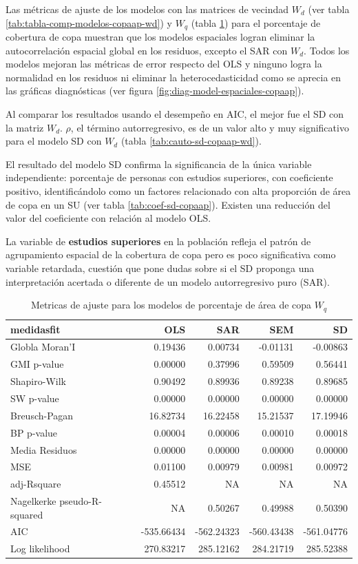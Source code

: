 \documentclass[12pt,a4paper,openany]{book}
\theoremstyle{definition}
\theoremstyle{definition}
\theoremstyle{definition}
\theoremstyle{remark}
\begin{document}
Las métricas de ajuste de los modelos con las matrices de vecindad
\(W_d\) (ver tabla \ref{tab:tabla-comp-modelos-copaap-wd}) y \(W_q\)
(tabla \ref{tab:tabla-comp-modelos-copaap-wq}) para el porcentaje de
cobertura de copa muestran que los modelos espaciales logran eliminar la
autocorrelación espacial global en los residuos, excepto el SAR con
\(W_d\). Todos los modelos mejoran las métricas de error respecto del
OLS y ninguno logra la normalidad en los residuos ni eliminar la
heterocedasticidad como se aprecia en las gráficas diagnósticas (ver
figura \ref{fig:diag-model-espaciales-copaap}).

Al comparar los resultados usando el desempeño en AIC, el mejor fue el
SD con la matriz \(W_d\). \(\rho\), el término autorregresivo, es de un
valor alto y muy significativo para el modelo SD con \(W_d\) (tabla
\ref{tab:cauto-sd-copaap-wd}).

El resultado del modelo SD confirma la significancia de la única
variable independiente: porcentaje de personas con estudios superiores,
con coeficiente positivo, identificándolo como un factores relacionado
con alta proporción de área de copa en un SU (ver tabla
\ref{tab:coef-sd-copaap}). Existen una reducción del valor del
coeficiente con relación al modelo OLS.

La variable de \textbf{estudios superiores} en la población refleja el
patrón de agrupamiento espacial de la cobertura de copa pero es poco
significativa como variable retardada, cuestión que pone dudas sobre si
el SD proponga una interpretación acertada o diferente de un modelo
autorregresivo puro (SAR).

\begin{table}[t]

\caption{\label{tab:tabla-comp-modelos-copaap-wq}Metricas de ajuste para los modelos de porcentaje de área de copa $W_q$}
\centering
\begin{tabular}{lrrrr}
\toprule
medidasfit & OLS & SAR & SEM & SD\\
\midrule
Globla Moran'I & 0.19436 & 0.00734 & -0.01131 & -0.00863\\
GMI p-value & 0.00000 & 0.37996 & 0.59509 & 0.56441\\
Shapiro-Wilk & 0.90492 & 0.89936 & 0.89238 & 0.89685\\
SW p-value & 0.00000 & 0.00000 & 0.00000 & 0.00000\\
Breusch-Pagan & 16.82734 & 16.22458 & 15.21537 & 17.19946\\
\addlinespace
BP p-value & 0.00004 & 0.00006 & 0.00010 & 0.00018\\
Media Residuos & 0.00000 & 0.00000 & 0.00000 & 0.00000\\
MSE & 0.01100 & 0.00979 & 0.00981 & 0.00972\\
adj-Rsquare & 0.45512 & NA & NA & NA\\
Nagelkerke pseudo-R-squared & NA & 0.50267 & 0.49988 & 0.50390\\
\addlinespace
AIC & -535.66434 & -562.24323 & -560.43438 & -561.04776\\
Log likelihood & 270.83217 & 285.12162 & 284.21719 & 285.52388\\
\bottomrule
\end{tabular}
\end{table}
\end{document}
